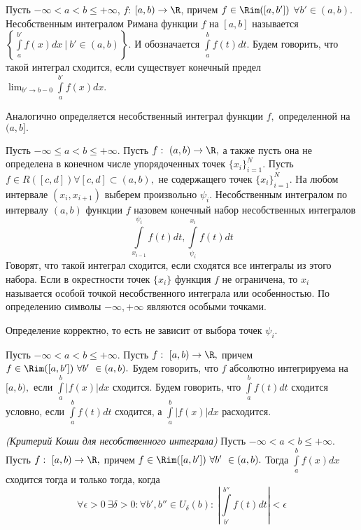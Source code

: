 \begin{definition}
    Пусть $-\infty < a < b \leq +\infty$, $f$: $[a, b) \rightarrow \R$, причем $f \in \Rim([a, b'])$ $\forall b' \in (a, b).$ Несобственным интегралом Римана функции $f$ на $[a, b]$ называется $\left \{ \int \limits_a^{b'} f(x) dx \ | \ b' \in (a, b) \right \}.$ И обозначается $\int \limits_a^b f(t) dt.$ Будем говорить, что такой интеграл сходится, если существует конечный предел $\lim_{b' \to b-0} \int \limits_a^{b'} f(x) dx.$
\end{definition}

Аналогично определяется несобственный интеграл функции $f,$ определенной на $(a, b].$

\begin{definition}
    Пусть $-\infty \leq a < b \leq +\infty.$ Пусть $f: \ (a, b) \rightarrow \R,$ а также пусть она не определена в конечном числе упорядоченных точек $\{x_i\}_{i = 1}^{N}.$ Пусть $f \in R([c, d]) \forall [c, d] \subset (a, b),$ не содержащего точек $\{x_i\}_{i = 1}^{N}.$ На любом интервале $(x_i, x_{i + 1})$ выберем произвольно $\psi_i.$ Несобственным интегралом по интервалу $(a, b)$ функции $f$ назовем конечный набор несобственных интегралов
    $$\int \limits_{x_{i -1}}^{\psi_i} f(t) dt, \int \limits_{\psi_i}^{x_i} f(t) dt$$
    Говорят, что такой интеграл сходится, если сходятся все интегралы из этого набора. Если в окрестности точек $\{x_i\}$ функция $f$ не ограничена, то $x_i$ называется особой точкой несобственного интеграла или особенностью. По определению символы $-\infty, +\infty$ являются особыми точками.
\end{definition}

\begin{note}
    Определение корректно, то есть не зависит от выбора точек $\psi_i.$
\end{note}

\begin{definition}
Пусть $-\infty < a < b \leq +\infty.$ Пусть $f: \ [a, b) \rightarrow \R,$ причем $f \in \Rim([a, b']) \ \forall b' \  \in (a, b).$ Будем говорить, что $f$ абсолютно интегрируема на $[a, b),$ если $\int \limits_a^b |f(x)| dx$ сходится. Будем говорить, что $\int \limits_a^b f(t) dt$ сходится условно, если $\int \limits_a^b f(t) dt$ сходится, а  $\int \limits_a^b |f(x)| dx$ расходится.
\end{definition}

\begin{theorem}
    \textit{(Критерий Коши для несобственного интеграла)} Пусть $-\infty < a < b \leq +\infty.$ Пусть $f: \ [a, b) \rightarrow \R,$ причем $f \in \Rim([a, b']) \ \forall b' \  \in (a, b).$ Тогда $\int \limits_a^b f(x) dx$ сходится тогда и только тогда, когда 
    $$\forall \epsilon > 0 \ \exists \delta > 0: \forall b', b'' \in U_{\delta}(b): \ |\int \limits_{b'}^{b''} f(t) dt| < \epsilon$$
\end{theorem}

